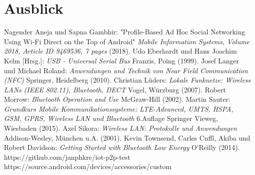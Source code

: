 \documentclass[12pt,a4paper]{article}
\begin{document}
    \pagebreak
\section{Ausblick}

    \begin{thebibliography}{10}
        Nagender Aneja und Sapna Gambhir: "Profile-Based Ad Hoc Social Networking Using Wi-Fi Direct on the Top of Android" {\it Mobile Information Systems, Volume 2018, Article ID 9469536, 7 pages} (2018).
         Udo Eberhardt und Hans Joachim Kelm [Hrsg.]: {\it USB - Universal Serial Bus} Franzis, Poing (1999).
        Josef Langer und Michael Roland: {\it Anwendungen und Technik von Near Field Communication (NFC)} Springer, Heidelberg (2010).
        Christian Lüders: {\it Lokale Funknetze: Wireless LANs (IEEE 802.11), Bluetooth, DECT} Vogel, Würzburg (2007).
        Robert Morrow: {\it Bluetooth Operation and Use} McGraw-Hill (2002).
        Martin Sauter: {\it Grundkurs Mobile Kommunikationssysteme: LTE-Advanced, UMTS, HSPA, GSM, GPRS, Wireless LAN und Bluetooth} 6.Auflage Springer Vieweg, Wiesbaden (2015).
        Axel Sikora: {\it Wireless LAN: Protokolle und Anwendungen} Addison-Wesley, München u.A. (2001).
		 Kevin Townsend, Carles Cuffí, Akiba und Robert Davidson: {\it Getting Started with Bluetooth Low Energy} O'Reilly (2014).
        https://github.com/janphkre/iot-p2p-test
        https://source.android.com/devices/accessories/custom
    \end{thebibliography}
\end{document}
